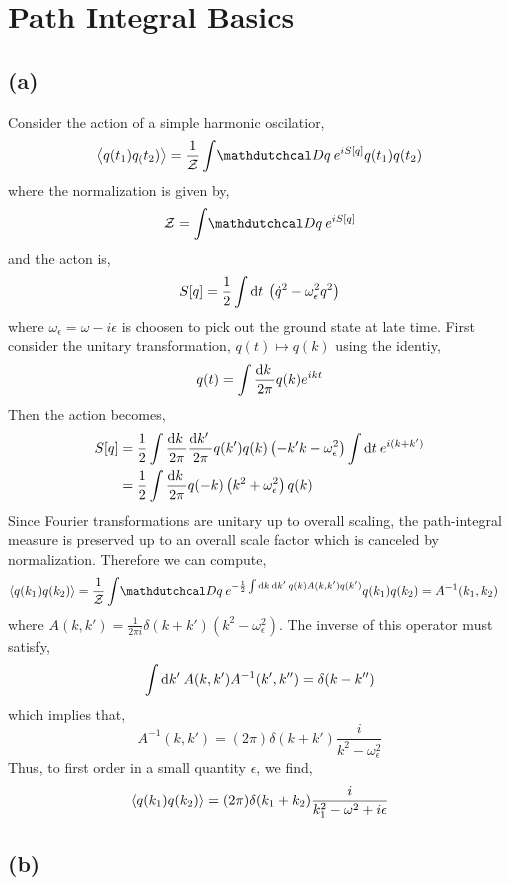 \documentclass[12pt]{article}
\begin{document}

\section{Path Integral Basics}

\subsection{(a)}

Consider the action of a simple harmonic oscilatior,
\[ \EV{q(t_1) q_(t_2)} = \frac{1}{\Znorm} \int \pathd{q} e^{i S[q]} q(t_1) q(t_2) \]
where the normalization is given by,
\[ \Znorm = \int \pathd{q} e^{i S[q]} \]
and the acton is,
\[ S[q] = \frac{1}{2} \int \mathrm{d}t \: \left( \dot{q}^2 - \omega^2_{\epsilon} q^2 \right) \]
where $\omega_{\epsilon} = \omega - i \epsilon$ is choosen to pick out the ground state at late time. First consider the unitary transformation, $q(t) \mapsto q(k)$ using the identiy,
\[ q(t) = \int \frac{\mathrm{d}k \:}{2\pi} q(k) e^{i k t} \]
Then the action becomes,
\begin{align*}
S[q] & = \frac{1}{2} \int \frac{\mathrm{d}k \:}{2\pi} \frac{\mathrm{d}k' \:}{2\pi} q(k') q(k) \left( -k'k - \omega_{\epsilon}^2  \right) \int \mathrm{d}t \: e^{i (k + k')} 
\\
& = \frac{1}{2} \int \frac{\mathrm{d}k \:}{2\pi} q(-k) \left(k^2 + \omega_{\epsilon}^2  \right) q(k)
\end{align*} 
Since Fourier transformations are unitary up to overall scaling, the path-integral measure is preserved up to an overall scale factor which is canceled by normalization. Therefore we can compute,
\begin{align*}
\EV{q(k_1) q(k_2)} & = \frac{1}{\Znorm} \int \pathd{q} e^{- \frac{1}{2} \int \d{k} \d{k'} q(k) A(k,k') q(k')} q(k_1) q(k_2) = A^{-1}(k_1, k_2) 
\end{align*}
where $A(k,k') = \frac{1}{2 \pi i} \delta(k + k') (k^2 - \omega_{\epsilon}^2)$. The inverse of this operator must satisfy,
\[ \int \mathrm{d}k' \: A(k, k') A^{-1}(k',k'') = \delta(k - k'') \] which implies that,
\[ A^{-1}(k,k') = (2 \pi) \delta(k + k') \frac{i}{k^2 - \omega_{\epsilon}^2} \]
Thus, to first order in a small quantity $\epsilon$, we find,
\[ \left< q(k_1) q(k_2) \right> = (2 \pi) \delta(k_1 + k_2) \frac{i}{k_1^2 - \omega^2 + i \epsilon} \]

\subsection{(b)}
\end{document}
